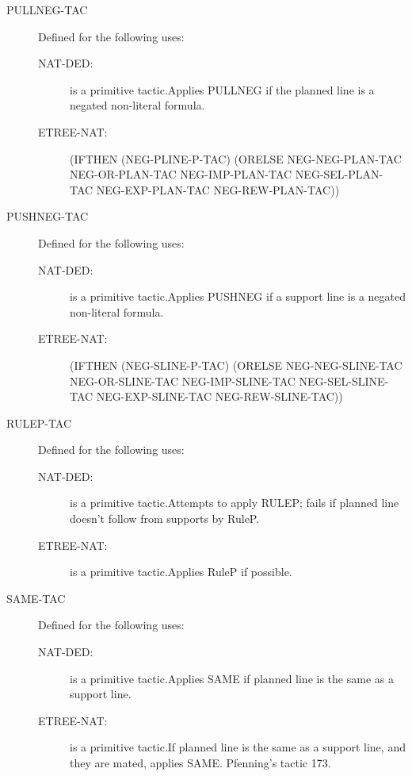 \begin{description}
\begin{description}
\end{description}

\item[PULLNEG-TAC]  Defined for the following uses:
\begin{description}
\item[NAT-DED:]  is a primitive tactic.Applies PULLNEG if the planned line is a negated non-literal formula.

\item[ETREE-NAT:] 
(IFTHEN (NEG-PLINE-P-TAC)
 (ORELSE NEG-NEG-PLAN-TAC NEG-OR-PLAN-TAC NEG-IMP-PLAN-TAC
  NEG-SEL-PLAN-TAC NEG-EXP-PLAN-TAC NEG-REW-PLAN-TAC))


\end{description}

\item[PUSHNEG-TAC]  Defined for the following uses:
\begin{description}
\item[NAT-DED:]  is a primitive tactic.Applies PUSHNEG if a support line is a negated non-literal formula.

\item[ETREE-NAT:] 
(IFTHEN (NEG-SLINE-P-TAC)
 (ORELSE NEG-NEG-SLINE-TAC NEG-OR-SLINE-TAC NEG-IMP-SLINE-TAC
  NEG-SEL-SLINE-TAC NEG-EXP-SLINE-TAC NEG-REW-SLINE-TAC))


\end{description}

\item[RULEP-TAC]  Defined for the following uses:
\begin{description}
\item[NAT-DED:]  is a primitive tactic.Attempts to apply RULEP; fails if planned line doesn't follow
from supports by RuleP.

\item[ETREE-NAT:]  is a primitive tactic.Applies RuleP if possible.

\end{description}

\item[SAME-TAC]  Defined for the following uses:
\begin{description}
\item[NAT-DED:]  is a primitive tactic.Applies SAME if planned line is the same as a support line.

\item[ETREE-NAT:]  is a primitive tactic.If planned line is the same as a support line, and they are mated,
applies SAME.  Pfenning's tactic 173.


\end{description}
\end{description}

